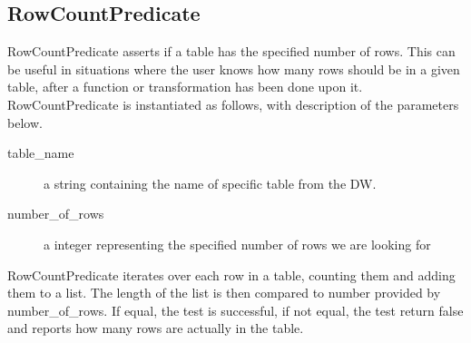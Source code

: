 \subsection{RowCountPredicate}
RowCountPredicate asserts if a table has the specified number of rows. This can be useful in situations where the user knows how many rows should be in a given table, after a function or transformation has been done upon it. RowCountPredicate is instantiated as follows, with description of the parameters below.


\begin{description}
\item [table\_name] a string containing the name of specific table from the DW. 
\item [number\_of\_rows] a integer representing the specified number of rows we are looking for
\end{description}

RowCountPredicate iterates over each row in a table, counting them and adding them to a list. The length of the list is then compared to number provided by number\_of\_rows. If equal, the test is successful, if not equal, the test return false and reports how many rows are actually in the table.

